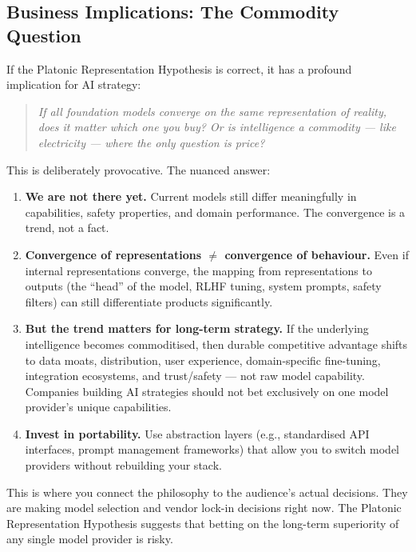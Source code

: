 \documentclass[11pt, a4paper]{article}
\begin{document}
\subsection{Business Implications: The Commodity Question}

If the Platonic Representation Hypothesis is correct, it has a profound
implication for AI strategy:

\begin{quote}
\emph{If all foundation models converge on the same representation of
reality, does it matter which one you buy? Or is intelligence a commodity
--- like electricity --- where the only question is price?}
\end{quote}

This is deliberately provocative. The nuanced answer:

\begin{enumerate}[leftmargin=2em]
  \item \textbf{We are not there yet.} Current models still differ
    meaningfully in capabilities, safety properties, and domain
    performance. The convergence is a trend, not a fact.

  \item \textbf{Convergence of representations $\neq$ convergence of
    behaviour.} Even if internal representations converge, the mapping
    from representations to outputs (the ``head'' of the model, RLHF
    tuning, system prompts, safety filters) can still differentiate
    products significantly.

  \item \textbf{But the trend matters for long-term strategy.} If the
    underlying intelligence becomes commoditised, then durable competitive
    advantage shifts to data moats, distribution, user experience,
    domain-specific fine-tuning, integration ecosystems, and trust/safety
    --- not raw model capability. Companies building AI strategies should
    not bet exclusively on one model provider's unique capabilities.

  \item \textbf{Invest in portability.} Use abstraction layers (e.g.,
    standardised API interfaces, prompt management frameworks) that allow
    you to switch model providers without rebuilding your stack.
\end{enumerate}

\begin{speakingnote}
This is where you connect the philosophy to the audience's actual
decisions. They are making model selection and vendor lock-in decisions
right now. The Platonic Representation Hypothesis suggests that betting
on the long-term superiority of any single model provider is risky.
\end{speakingnote}
\end{document}
